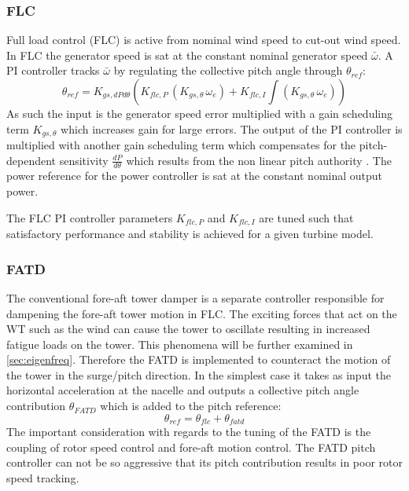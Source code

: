 \subsubsection{FLC}
Full load control (FLC) is active from nominal wind speed to cut-out wind speed. In FLC the generator speed is sat at the constant nominal generator speed $ \bar{\omega} $. A PI controller tracks $ \bar{\omega} $ by regulating the collective pitch angle through $ \theta_{ref} $:
\begin{equation}\label{eq:pi_flc_ctrl}
	\theta_{ref} = K_{gs,dPd\theta} (K_{flc,P} \, (K_{gs,\theta} \, \omega_e ) + K_{flc,I} \int (K_{gs,\theta} \, \omega_e))
\end{equation}
As such the input is the generator speed error multiplied with a gain scheduling term $ K_{gs,\theta} $ which increases gain for large errors. The output of the PI controller is multiplied with another gain scheduling term which compensates for the pitch-dependent sensitivity $ \frac{dP}{d\theta} $ which results from the non linear pitch authority \cite{Pao2009}. The power reference for the power controller is sat at the constant nominal output power.

The FLC PI controller parameters $ K_{flc,P} $ and $ K_{flc,I} $ are tuned such that satisfactory performance and stability is achieved for a given turbine model. 


\subsubsection{FATD}
The conventional fore-aft tower damper is a separate controller responsible for dampening the fore-aft tower motion in FLC. The exciting forces that act on the WT such as the wind can cause the tower to oscillate resulting in increased fatigue loads on the tower. This phenomena will be further examined in \cref{sec:eigenfreq}. Therefore the FATD is implemented to counteract the motion of the tower in the surge/pitch direction. In the simplest case it takes as input the horizontal acceleration at the nacelle and outputs a collective pitch angle contribution $ \theta_{FATD} $ which is added to the pitch reference:
\begin{equation}\label{eq:fatd}
	\theta_{ref} = \theta_{flc} + \theta_{fatd}
\end{equation}
The important consideration with regards to the tuning of the FATD is the coupling of rotor speed control and fore-aft motion control. The FATD pitch controller can not be so aggressive that its pitch contribution results in poor rotor speed tracking.

